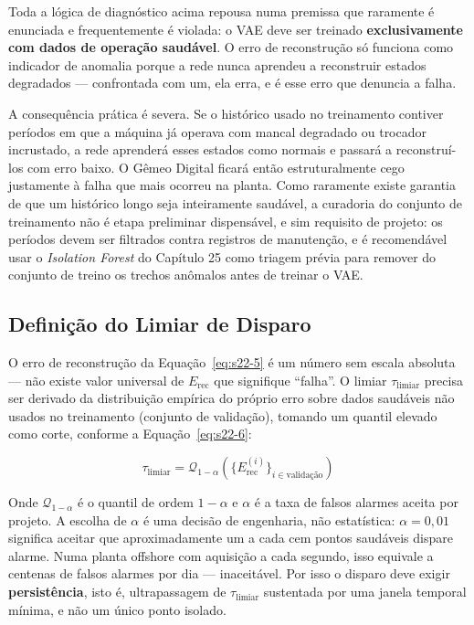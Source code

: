 \documentclass[12pt,a4paper]{article}
\numberwithin{equation}{section}
\numberwithin{table}{section}
\numberwithin{figure}{section}
\begin{document}
{	Toda a lógica de diagnóstico acima repousa numa premissa que raramente é enunciada e frequentemente é violada: o VAE deve ser treinado \textbf{exclusivamente com dados de operação saudável}. O erro de reconstrução só funciona como indicador de anomalia porque a rede nunca aprendeu a reconstruir estados degradados — confrontada com um, ela erra, e é esse erro que denuncia a falha.

	A consequência prática é severa. Se o histórico usado no treinamento contiver períodos em que a máquina já operava com mancal degradado ou trocador incrustado, a rede aprenderá esses estados como normais e passará a reconstruí-los com erro baixo. O Gêmeo Digital ficará então estruturalmente cego justamente à falha que mais ocorreu na planta. Como raramente existe garantia de que um histórico longo seja inteiramente saudável, a curadoria do conjunto de treinamento não é etapa preliminar dispensável, e sim requisito de projeto: os períodos devem ser filtrados contra registros de manutenção, e é recomendável usar o \textit{Isolation Forest} do Capítulo 25 como triagem prévia para remover do conjunto de treino os trechos anômalos antes de treinar o VAE.

	\subsection{Definição do Limiar de Disparo}

	O erro de reconstrução da Equação~\eqref{eq:s22-5} é um número sem escala absoluta — não existe valor universal de $E_{\text{rec}}$ que signifique ``falha''. O limiar $\tau_{\text{limiar}}$ precisa ser derivado da distribuição empírica do próprio erro sobre dados saudáveis não usados no treinamento (conjunto de validação), tomando um quantil elevado como corte, conforme a Equação~\eqref{eq:s22-6}:

	\begin{equation}\label{eq:s22-6}
	\tau_{\text{limiar}} = \mathcal{Q}_{1-\alpha}\left( \{ E_{\text{rec}}^{(i)} \}_{i \in \text{validação}} \right)
\end{equation}

	Onde $\mathcal{Q}_{1-\alpha}$ é o quantil de ordem $1-\alpha$ e $\alpha$ é a taxa de falsos alarmes aceita por projeto. A escolha de $\alpha$ é uma decisão de engenharia, não estatística: $\alpha = 0{,}01$ significa aceitar que aproximadamente um a cada cem pontos saudáveis dispare alarme. Numa planta offshore com aquisição a cada segundo, isso equivale a centenas de falsos alarmes por dia — inaceitável. Por isso o disparo deve exigir \textbf{persistência}, isto é, ultrapassagem de $\tau_{\text{limiar}}$ sustentada por uma janela temporal mínima, e não um único ponto isolado.

}
\end{document}
